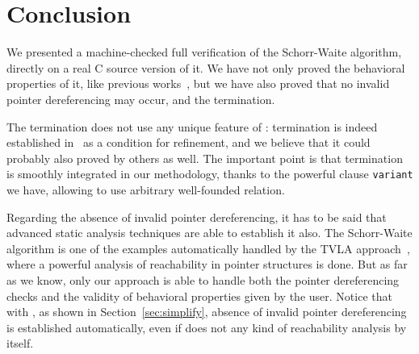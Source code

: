 \section{Conclusion}
\label{sec:conclusion}

We presented a machine-checked full verification of the Schorr-Waite
algorithm, directly on a real C source version of it. We have not only
proved the behavioral properties of it, like previous
works~\cite{bornat00mpc,mehta03cade,abrial03fme}, but we have also
proved that no invalid pointer dereferencing may occur, and the
termination.

The termination does not use any unique feature of \caduceus{}:
termination is indeed established in~\cite{abrial03fme} as a condition
for refinement, and we believe that it could probably also proved by
others as well. The important point is that termination is smoothly
integrated in our methodology, thanks to the powerful clause
\texttt{variant} we have, allowing to use arbitrary well-founded
relation.

Regarding the absence of invalid pointer dereferencing, it has to be
said that advanced static analysis techniques are able to establish it
also. The Schorr-Waite algorithm is one of the examples automatically
handled by the TVLA approach~\cite{sagiv02toplas,reps03esop}, where a powerful
analysis of reachability in pointer structures is done. But as far as
we know, only our approach is able to handle both the pointer
dereferencing checks and the validity of behavioral properties given
by the user. Notice that with \caduceus, as shown in
Section~\ref{sec:simplify}, absence of invalid pointer dereferencing
is established automatically, even if \caduceus{} does not any kind of
reachability analysis by itself.

